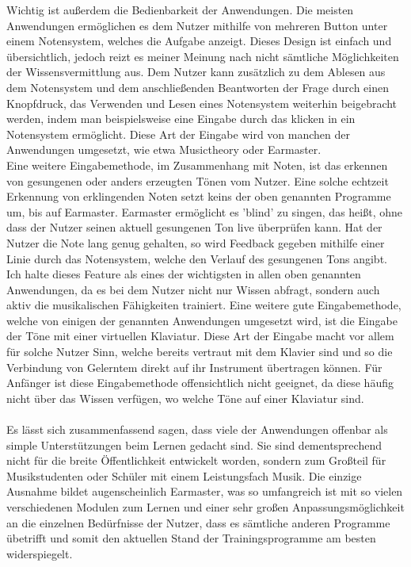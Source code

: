 Wichtig ist außerdem die Bedienbarkeit der Anwendungen. Die meisten Anwendungen ermöglichen es dem Nutzer mithilfe von mehreren Button unter einem Notensystem, welches die Aufgabe anzeigt. Dieses Design ist einfach und übersichtlich, 
jedoch reizt es meiner Meinung nach nicht sämtliche Möglichkeiten der Wissensvermittlung aus. Dem Nutzer kann zusätzlich zu dem Ablesen aus dem Notensystem und dem anschließenden Beantworten der Frage durch einen Knopfdruck, das Verwenden und Lesen eines Notensystem weiterhin beigebracht werden, 
indem man beispielsweise eine Eingabe durch das klicken in ein Notensystem ermöglicht. Diese Art der Eingabe wird von manchen der Anwendungen umgesetzt, wie etwa Musictheory oder Earmaster. \\
Eine weitere Eingabemethode, im Zusammenhang mit Noten, ist das erkennen von gesungenen oder anders erzeugten Tönen vom Nutzer. Eine solche echtzeit Erkennung von erklingenden Noten setzt keins der oben genannten Programme um, bis auf Earmaster. Earmaster ermöglicht es 'blind' zu singen, das heißt, ohne dass der Nutzer seinen aktuell gesungenen Ton live überprüfen kann. Hat der Nutzer die 
Note lang genug gehalten, so wird Feedback gegeben mithilfe einer Linie durch das Notensystem, welche den Verlauf des gesungenen Tons angibt. Ich halte dieses Feature als eines der wichtigsten in allen oben genannten Anwendungen, da es bei dem Nutzer nicht nur Wissen abfragt, sondern auch aktiv die musikalischen Fähigkeiten trainiert.
Eine weitere gute Eingabemethode, welche von einigen der genannten Anwendungen umgesetzt wird, ist die Eingabe der Töne mit einer virtuellen Klaviatur. Diese Art der Eingabe macht vor allem für solche Nutzer Sinn, welche bereits vertraut mit dem Klavier sind und so die Verbindung von Gelerntem direkt auf ihr Instrument übertragen können. Für 
Anfänger ist diese Eingabemethode offensichtlich nicht geeignet, da diese häufig nicht über das Wissen verfügen, wo welche Töne auf einer Klaviatur sind. \\\\
Es lässt sich zusammenfassend sagen, dass viele der Anwendungen offenbar als simple Unterstützungen beim Lernen gedacht sind. Sie sind dementsprechend nicht für die breite Öffentlichkeit entwickelt worden, sondern zum Großteil für Musikstudenten oder Schüler mit einem Leistungsfach Musik. Die einzige Ausnahme bildet augenscheinlich Earmaster, was so umfangreich ist mit so vielen verschiedenen Modulen zum Lernen und einer sehr großen Anpassungsmöglichkeit an die einzelnen Bedürfnisse der Nutzer, dass es sämtliche anderen Programme übetrifft und somit den aktuellen Stand der Trainingsprogramme am besten widerspiegelt. 
